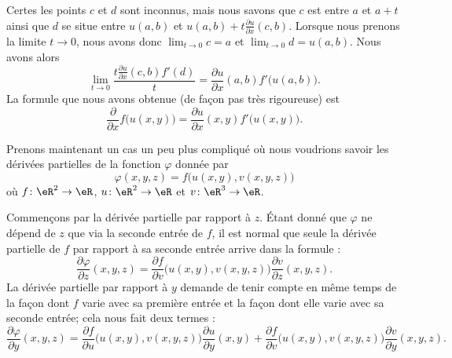 Certes les points \( c\) et \( d\) sont inconnus, mais nous savons que \( c\) est entre \( a\) et \( a+t\) ainsi que \( d\) se situe entre \( u(a,b)\) et \( u(a,b)+t\frac{ \partial u }{ \partial x }(c,b)\). Lorsque nous prenons la limite \( t\to 0\), nous avons donc \( \lim_{t\to 0} c=a\) et \( \lim_{t\to 0} d=u(a,b)\). Nous avons alors
\begin{equation}
	\lim_{t\to 0} \frac{ t\frac{ \partial u }{ \partial x }(c,b)f'(d) }{ t }=\frac{ \partial u }{ \partial x }(a,b)f'\big( u(a,b) \big).
\end{equation}
La formule que nous avons obtenue (de façon pas très rigoureuse) est
\begin{equation}
	\frac{ \partial  }{ \partial x }f\big( u(x,y) \big)=\frac{ \partial u }{ \partial x }(x,y)f'\big( u(x,y) \big).
\end{equation}

Prenons maintenant un cas un peu plus compliqué où nous voudrions savoir les dérivées partielles de la fonction \( \varphi\) donnée par
\begin{equation}
	\varphi(x,y,z)=f\big( u(x,y),v(x,y,z) \big)
\end{equation}
où \( f\colon \eR^2\to \eR\), \( u\colon \eR^2\to \eR\) et \( v\colon \eR^3\to \eR\).

Commençons par la dérivée partielle par rapport à \( z\). Étant donné que \( \varphi\) ne dépend de \( z\) que via la seconde entrée de \( f\), il est normal que seule la dérivée partielle de \( f\) par rapport à sa seconde entrée arrive dans la formule :
\begin{equation}
	\frac{ \partial \varphi }{ \partial z }(x,y,z)=\frac{ \partial f }{ \partial v }\big( u(x,y),v(x,y,z) \big)\frac{ \partial v }{ \partial z }(x,y,z).
\end{equation}
La dérivée partielle par rapport à \( y\) demande de tenir compte en même temps de la façon dont \( f\) varie avec sa première entrée et la façon dont elle varie avec sa seconde entrée; cela nous fait deux termes :
\begin{equation}
	\frac{ \partial \varphi }{ \partial y }(x,y,z)=\frac{ \partial f }{ \partial u }\big( u(x,y),v(x,y,z) \big)\frac{ \partial u }{ \partial y }(x,y)+\frac{ \partial f }{ \partial v }\big( u(x,y),v(x,y,z) \big)\frac{ \partial v }{ \partial y }(x,y,z).
\end{equation}


